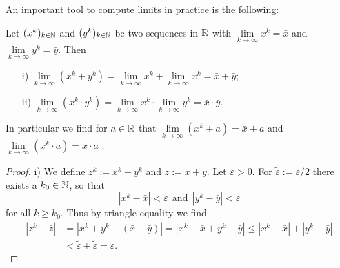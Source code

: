 %
\begin{frame} 
%
An important tool to compute limits in practice is the following:
\begin{theo}
	Let $(x^k)_{k\in {\mathbb{N}}}$ and $(y^k)_{k\in {\mathbb{N}}}$ be two sequences in ${\mathbb{R}}$ with $\lim\limits_{k\to\infty}x^k= \bar{x}$ and $\lim\limits_{k\to\infty}y^k= \bar{y}$. Then
	\begin{itemize}
		\item[i)] $\lim\limits_{k\to\infty} (x^k + y^k) = \lim\limits_{k\to\infty}x^k + \lim\limits_{k\to\infty}x^k = \bar{x}+\bar{y}$;
		\item[ii)] $\lim\limits_{k\to\infty} (x^k\cdot y^k) = \lim\limits_{k\to\infty}x^k \cdot \lim\limits_{k\to\infty}y^k = \bar{x}\cdot\bar{y}$.
	\end{itemize}
	In particular we find for $a \in {\mathbb{R}}$ that $\lim\limits_{k\to\infty} (x^k + a) = \bar{x} +a$ and $\lim\limits_{k\to\infty} (x^k \cdot a) = \bar{x}\cdot a$ .
\end{theo} 
\begin{proof} \footnotesize
	i) We define $z^k := x^k + y^k$ and $\bar{z} := \bar{x} + \bar{y}$. Let $\varepsilon>0$. For ${\tilde{\varepsilon}} := \varepsilon/{2}$ there exists a $k_0 \in {\mathbb{N}}$, so that
	$$|x^k-\bar{x}| <  \tilde{\varepsilon} ~~\text{and}~~|y^k-\bar{y}| <  \tilde{\varepsilon}$$
	for all $k \geq k_0$. Thus by triangle equality we find
	\begin{align*}
	|z^k - \bar{z}| &= |x^k+y^k - (\bar{x} + \bar{y})| 
	= |x^k- \bar{x} +y^k - \bar{y}| 
	\leq |x^k- \bar{x}| + |y^k - \bar{y}| \\
	&<  \tilde{\varepsilon}+\tilde{\varepsilon} = \varepsilon.
	\end{align*}


\end{proof}
\end{frame}
